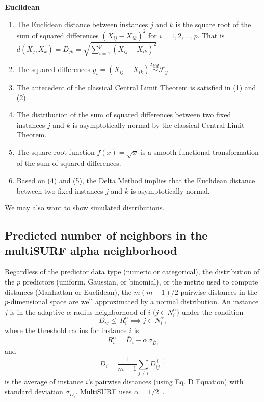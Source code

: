 \documentclass[10pt,letterpaper]{article}\usepackage[]{graphicx}\usepackage[]{color}
\begin{document}
\noindent \textbf{Euclidean}
\begin{enumerate}
\item The Euclidean distance between instances $j$ and $k$ is the square root of the sum of squared differences $(X_{ij}-X_{ik})^2$ for $i=1,2,\dots,p$. That is $d(X_j,X_k)=D_{jk} = \sqrt{\displaystyle \sum_{i=1}^{p}(X_{ij}-X_{ik})^2}$
\item The squared differences $y_i = (X_{ij} - X_{ik})^2 \overset{iid}{\sim} \mathcal{F}_y$.
\item The antecedent of the classical Central Limit Theorem is satisfied in (1) and (2).
\item The distribution of the sum of squared differences between two fixed instances $j$ and $k$ is asymptotically normal by the classical Central Limit Theorem.
\item The square root function $f(x) = \sqrt{x}$ is a smooth functional transformation of the sum of squared differences.
\item Based on (4) and (5), the Delta Method implies that the Euclidean distance between two fixed instances $j$ and $k$ is asymptotically normal.
\end{enumerate}
We may also want to show simulated distributions. 

\subsection{Predicted number of neighbors in the multiSURF alpha neighborhood}

Regardless of the predictor data type (numeric or categorical), the distribution of the $p$ predictors (uniform, Gaussian, or binomial), or the metric used to compute distances (Manhattan or Euclidean), the $m(m-1)/2$ pairwise distances in the $p$-dimensional space are well approximated by a normal distribution. An instance $j$ is in the adaptive $\alpha$-radius neighborhood of $i$ ($j \in N^{\alpha}_{i}$) under the condition
%
%
\begin{equation}
D_{ij} \le \, R_i^{\alpha} \implies j \in N^{\alpha}_{i},
\end{equation}
where the threshold radius for instance $i$ is
\begin{equation}
R_i^{\alpha} =  \bar{D}_i - \alpha \, \sigma_{\bar{D}_i}
\end{equation}
and
\begin{equation}
\bar{D}_i = \frac{1}{m-1} \sum_{j \ne i} D^{(\cdot)}_{ij}
\end{equation}
is the average of instance $i$'s pairwise distances (using Eq. D Equation) with standard deviation $\sigma_{\bar{D}_i}$. MultiSURF uses $\alpha=1/2$~\cite{msurf13}.
\end{document}
